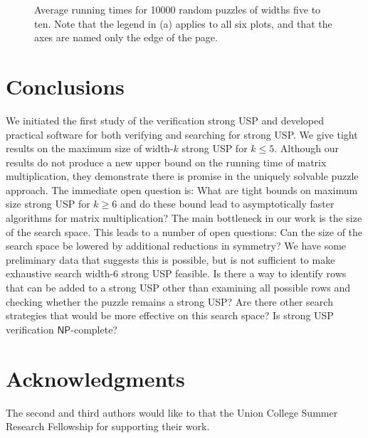 \documentclass[11pt]{article}
\renewcommand\NP{\ensuremath{\mathsf{NP}}}
\begin{document}
\begin{figure}
  
  \caption{Average running times for 10000 random puzzles of widths
    five to ten. Note that the legend in (a) applies to all six plots,
    and that the axes are named only the edge of the page.}
  \label{fig:perform}
\end{figure}
  
\section{Conclusions}
\label{sec:conclusion}

We initiated the first study of the verification strong USP and
developed practical software for both verifying and searching for
strong USP.  We give tight results on the maximum size of width-$k$
strong USP for $k \le 5$.  Although our results do not produce a new
upper bound on the running time of matrix multiplication, they
demonstrate there is promise in the uniquely solvable puzzle approach.
The immediate open question is: What are tight bounds on maximum size
strong USP for $k \ge 6$ and do these bound lead to asymptotically
faster algorithms for matrix multiplication?  The main bottleneck in
our work is the size of the search space.  This leads to a number of
open questions: Can the size of the search space be lowered by
additional reductions in symmetry?  We have some preliminary data that
suggests this is possible, but is not sufficient to make exhaustive
search width-6 strong USP feasible.  Is there a way to identify rows
that can be added to a strong USP other than examining all possible
rows and checking whether the puzzle remains a strong USP?  Are there
other search strategies that would be more effective on this search
space?  Is strong USP verification \NP-complete?

\section{Acknowledgments}

The second and third authors would like to that the Union College
Summer Research Fellowship for supporting their work.

 

\appendix
\end{document}
